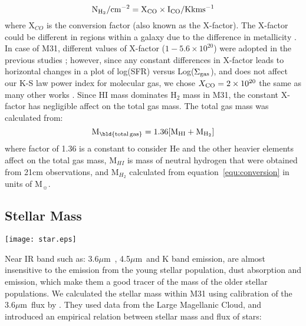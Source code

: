 \documentclass[useAMS,usenatbib]{mn2e}
\newcommand \um    {$\mu$m\ }
\begin{document}
\begin{equation}
\label{equ:conversion}
\rm N_{H_2}/\rm cm^{-2} = X_{CO} \times I_{CO}/\rm K km s^{-1}
\end{equation}
where X$_{CO}$ is the conversion factor (also known as the X-factor). The X-factor could be different in regions within a galaxy due to the difference in metallicity \citep{Wilson95, Bosselli02, Bolato13}. In case of M31, different values of X-factor ($1-5.6 \times 10^{20}$) were adopted in the previous studies \citep[e.g.][]{Ford13, Bolato13, Leroy11, Bolato08, Nieten06}; however, since any constant differences in X-factor leads to horizontal changes in a plot of log(SFR) versus Log($\Sigma_{\rm {gas}}$), and does not affect our K-S law power index for molecular gas,  we chose $X_{\rm {CO}}= 2 \times 10^{20}$  the same as many other works \citep[e.g.][]{Ford13, Smith12}. Since HI mass dominates H$_2$ mass in M31, the constant X-factor has negligible affect on the total gas mass. The total gas mass was calculated from:
\begin{equation}
\label{equ:total_gas}
\rm M_{\rm \bld {total \, gas}} = 1.36[M_{HI}+M_{H_2}]
\end{equation}
where  factor of 1.36 is a constant to consider He and the other heavier elements affect on the total gas mass, M$_{HI}$ is mass of neutral hydrogen that were obtained from 21cm observations, and M$_{H_2}$ calculated from equation~\ref{equ:conversion} in units of M$_{\sun}$.


\subsection{Stellar Mass}
\label{sec:starmass}
\begin{figure*}
\centering
\texttt{[image: star.eps]}
\caption{Stellar Mass surface density with pixel size of 4.3\arcsec and FWHM of 1\arcsec.7. The stellar surface density map is produced using IRAC 3.6~$\mu$m data and its calibration presented in equation~\ref{equ:eskew}.}
\label{fig:stellarmass}
\end{figure*}

Near IR band such as: 3.6\um, 4.5\um and K band emission, are almost insensitive to the emission from the young stellar population, dust absorption and emission, which make them a good tracer of the mass of the older stellar populations\citep[e.g.,][]{Elmgreen84, Eskew12, Zhu10}. We calculated the stellar mass within M31 using calibration of the 3.6\um flux by \cite{Eskew12}. They used data from the Large Magellanic Cloud, and introduced an empirical relation between stellar mass and flux of stars:
\end{document}

